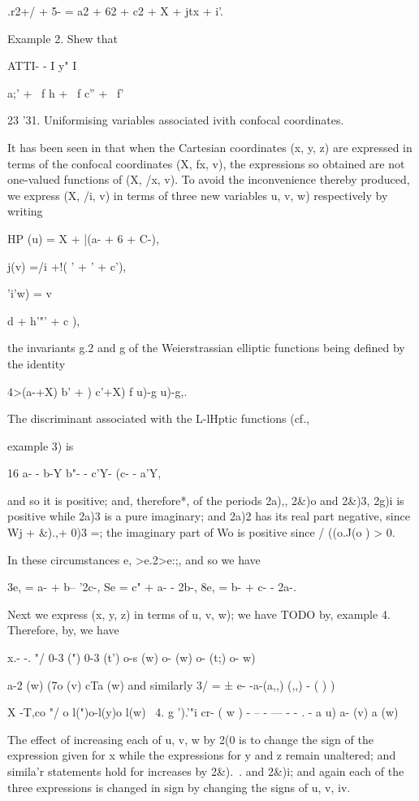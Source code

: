 {{.r2+/ + 5- = a2 + 62 + c2 + X + jtx + i'.

Example 2. Shew that

ATTI- - I y" I

   a;' + \ f h + \ f c'' + \ f'

23 '31. Uniformising variables associated ivith confocal coordinates.

It has been seen in that when the Cartesian coordinates (x, y,
z) are expressed in terms of the confocal coordinates (X, fx, v), the
expressions so obtained are not one-valued functions of (X, /x, v). To
avoid the inconvenience thereby produced, we express (X, /i, v) in
terms of three new variables u, v, w) respectively by writing

HP (u) = X + |(a- + 6 + C-),

 j(v) =/i +!( ' + ' + c'),

'i'w) = v \ \ {d + h'"' + c ),

the invariants g.2 and g of the Weierstrassian elliptic functions
being defined by the identity

4>(a-+X) b' + ) c'+X) f u)-g u)-g,.

%
%

The discriminant associated with the L-lHptic functions (cf.,

example 3) is

16 a- - b-Y b"- - c'Y- (c- - a'Y,

and so it is positive; and, therefore*, of the periods 2a),, 2\&)o
and 2\&)3, 2g)i is positive while 2a)3 is a pure imaginary; and 2a)2
has its real part negative, since Wj + \&).,+ 0)3 =; the imaginary
part of Wo is positive since / ((o.J(o ) > 0.

In these circumstances e, >e.2>e:;, and so we have

3e, = a- + b-- '2c-, Se = c" + a- - 2b-, 8e, = b- + c- - 2a-.

Next we express (x, y, z) in terms of u, v, w); we have
TODO
by, example 4. Therefore, by, we have

x.- -. "/ 0-3 (") 0-3 (t') o-s (w) o- (w) o- (t;) o- w)

a-2 (w) (7o (v) cTa (w) and similarly 3/ = ± e- -a-(a,,) (,,) - ( ) )

X -T,co "/ o l(")o-l(y)o l(w) \ 4. g ').'"i cr- ( w ) - -- - --- - - .
- a u) a- (v) a (w)

The effect of increasing each of u, v, w by 2(0 is to change the sign
of the expression given for x while the expressions for y and z remain
unaltered; and simila'r statements hold for increases by 2\&).\ . and
2\&)i; and again each of the three expressions is changed in sign by
changing the signs of u, v, iv.

}}}
